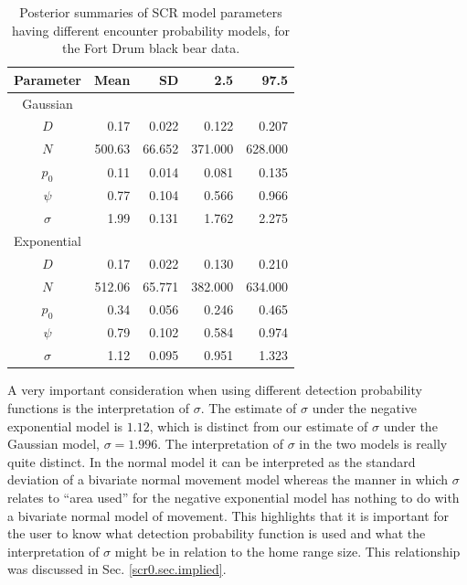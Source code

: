 \begin{table}[ht]
\centering
\caption{Posterior summaries of SCR model parameters having 
  different encounter probability models, for the Fort Drum black bear data.}
\begin{tabular}{crrrr}
\hline \hline
Parameter & Mean & SD & 2.5 & 97.5 \\
\hline

Gaussian  &   &      &           &        \\
\hline
$D$    &   0.17   & 0.022     &  0.122 & 0.207  \\
$N$    &  500.63 & 66.652  & 371.000   & 628.000       \\
$p_0$  &    0.11  & 0.014   & 0.081& 0.135     \\
$\psi$  &   0.77  & 0.104    & 0.566 & 0.966    \\
$\sigma$ &  1.99 & 0.131  &1.762 & 2.275     \\

Exponential &   &      &          &        \\
\hline
$D$  &   0.17 &  0.022 &	0.130		& 	0.210	 \\
$N$   &  512.06 &  65.771  &	382.000		& 	634.000	 \\
$p_0$  &    0.34 &   0.056  &	0.246	& 0.465		 \\
$\psi$  &   0.79  &  0.102  &	0.584		& 	0.974	 \\
$\sigma$ &  1.12  & 0.095  &	0.951		& 	1.323	 \\ \hline
\end{tabular}
\label{covariates.tab.SCR0exp}
\end{table}

A very important consideration when using different detection probability functions is the
interpretation of $\sigma$.  The estimate of $\sigma$ under the negative exponential model is
$1.12$, which is distinct from our
estimate of $\sigma$ under the Gaussian model, $\sigma = 1.996$.
The interpretation
of $\sigma$ in the two models is really quite distinct. In the normal
model it can be interpreted as the standard deviation of a bivariate
normal movement model whereas the manner in which $\sigma$ relates to
``area used'' for the negative exponential model has nothing to do
with a bivariate normal model of movement.  This highlights that it is
important for the user to know what detection probability function is used and what
the interpretation of $\sigma$ might be in relation to the home range size.
This relationship was discussed in Sec. \ref{scr0.sec.implied}.

